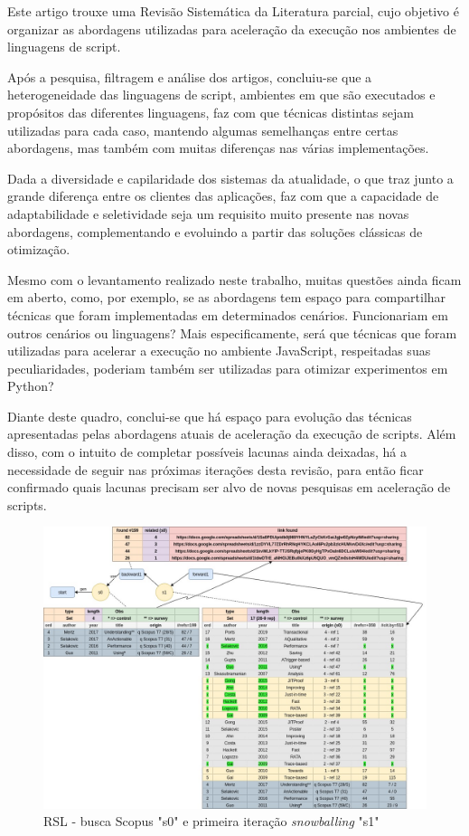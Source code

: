 \documentclass[sigconf]{acmart}
\begin{document}
Este artigo trouxe uma Revisão Sistemática da Literatura parcial, cujo objetivo é organizar as abordagens utilizadas para aceleração da execução nos ambientes de linguagens de script.

Após a pesquisa, filtragem e análise dos artigos, concluiu-se que a heterogeneidade das linguagens de script, ambientes em que são executados e propósitos das diferentes linguagens, faz com que técnicas distintas sejam utilizadas para cada caso, mantendo algumas semelhanças entre certas abordagens, mas também com muitas diferenças nas várias implementações.

Dada a diversidade e capilaridade dos sistemas da atualidade, o que traz junto a grande diferença entre os clientes das aplicações, faz com que a capacidade de adaptabilidade e seletividade seja um requisito muito presente nas novas abordagens, complementando e evoluindo a partir das soluções clássicas de otimização.

Mesmo com o levantamento realizado neste trabalho, muitas questões ainda ficam em aberto, como, por exemplo, se as abordagens tem espaço para compartilhar técnicas que foram implementadas em determinados cenários. Funcionariam em outros cenários ou linguagens? Mais especificamente, será que técnicas que foram utilizadas para acelerar a execução no ambiente JavaScript, respeitadas suas peculiaridades, poderiam também ser utilizadas para otimizar experimentos em Python? 

Diante deste quadro, conclui-se que há espaço para evolução das técnicas apresentadas pelas abordagens atuais de aceleração da execução de scripts. Além disso, com o intuito de completar possíveis lacunas ainda deixadas, há a necessidade de seguir nas próximas iterações desta revisão, para então ficar confirmado quais lacunas precisam ser alvo de novas pesquisas em aceleração de scripts.




\begin{figure}
  \includegraphics[width=\textwidth]{rsl_snowb_2020_2.jpg}
  \caption{RSL - busca Scopus "s0" e primeira iteração \textit{snowballing} "s1"}
\end{figure}
\end{document}
